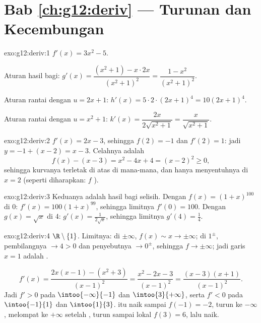 \section*{Bab \ref{ch:g12:deriv} --- Turunan dan Kecembungan}

\begin{solution}{exo:g12:deriv:1}
$f'(x) = 3x^2 - 5$.

Aturan hasil bagi:
$g'(x) = \dfrac{(x^2+1) - x\cdot 2x}{(x^2+1)^2} = \dfrac{1 - x^2}{(x^2+1)^2}$.

Aturan rantai dengan $u = 2x+1$: $h'(x) = 5 \cdot 2 \cdot (2x+1)^4 = 10(2x+1)^4$.

Aturan rantai dengan $u = x^2 + 1$:
$k'(x) = \dfrac{2x}{2\sqrt{x^2+1}} = \dfrac{x}{\sqrt{x^2+1}}$.
\end{solution}

\begin{solution}{exo:g12:deriv:2}
$f'(x) = 2x - 3$, sehingga $f(2) = -1$ dan $f'(2) = 1$: jadi 
$y = -1 + (x - 2) = x - 3$. Celahnya adalah
\[
f(x) - (x - 3) = x^2 - 4x + 4 = (x-2)^2 \geq 0 ,
\]
sehingga kurvanya terletak di atas  di mana-mana, dan hanya
menyentuhnya di $x = 2$ (seperti diharapkan: $f$ ).
\end{solution}

\begin{solution}{exo:g12:deriv:3}
Keduanya adalah hasil bagi selisih. Dengan $f(x) = (1+x)^{100}$ di $0$:
$f'(x) = 100(1+x)^{99}$, sehingga limitnya $f'(0) = 100$.
Dengan $g(x) = \sqrt{x}$ di $4$: $g'(x) = \frac{1}{2\sqrt{x}}$, sehingga
limitnya $g'(4) = \frac14$.
\end{solution}

\begin{solution}{exo:g12:deriv:4}
 $\R \setminus \{1\}$. Limitnya: di $\pm\infty$, $f(x) \sim x \to
\pm\infty$; di $1^\pm$, pembilangnya $\to 4 > 0$ dan penyebutnya $\to 0^\pm$,
sehingga $f \to \pm\infty$; jadi garis $x = 1$ adalah .

\[
f'(x) = \frac{2x(x-1) - (x^2+3)}{(x-1)^2} = \frac{x^2 - 2x - 3}{(x-1)^2}
= \frac{(x-3)(x+1)}{(x-1)^2}.
\]
Jadi $f' > 0$ pada $\intoo{-\infty}{-1}$ dan $\intoo{3}{+\infty}$, serta
$f' < 0$ pada $\intoo{-1}{1}$ dan $\intoo{1}{3}$.  itu naik sampai
 $f(-1) = -2$, turun ke $-\infty$, melompat ke $+\infty$ setelah
, turun sampai  lokal $f(3) = 6$, lalu naik.
\end{solution}

